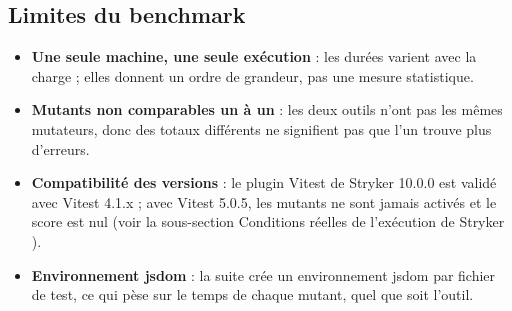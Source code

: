 \documentclass[12pt,a4paper]{article}
\begin{document}
\subsection{Limites du benchmark}
\begin{itemize}
    \item \textbf{Une seule machine, une seule exécution} : les durées varient avec la charge ; elles donnent un ordre de grandeur, pas une mesure statistique.
    \item \textbf{Mutants non comparables un à un} : les deux outils n'ont pas les mêmes mutateurs, donc des totaux différents ne signifient pas que l'un \og trouve plus \fg{} d'erreurs.
    \item \textbf{Compatibilité des versions} : le plugin Vitest de Stryker 10.0.0 est validé avec Vitest 4.1.x ; avec Vitest 5.0.5, les mutants ne sont jamais activés et le score est nul (voir la sous-section \og Conditions réelles de l'exécution de Stryker \fg{}).
    \item \textbf{Environnement jsdom} : la suite crée un environnement jsdom par fichier de test, ce qui pèse sur le temps de chaque mutant, quel que soit l'outil.
\end{itemize}
\end{document}
